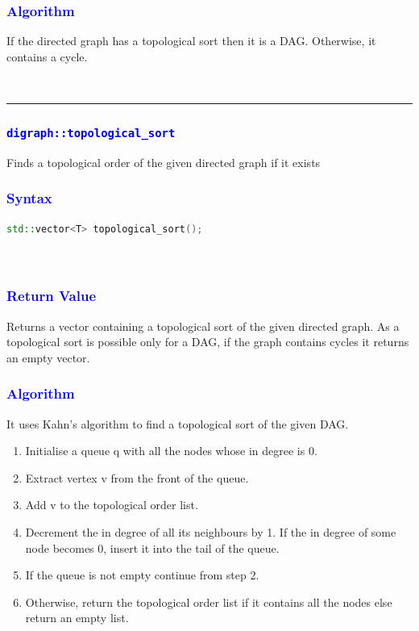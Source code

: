 \documentclass[11pt,a4paper]{article}
\begin{document}
\subsubsection*{\textcolor{blue}{ \large {Algorithm
}}}
If the directed graph has a topological sort then it is a DAG. Otherwise, it contains a cycle.


\\
\rule{17cm}{0.1mm}

\subsubsection*{\textcolor{blue}{\Large\texttt{digraph::topological\_sort
}}}
Finds a topological order of the given directed graph if it exists


\subsubsection*{\textcolor{blue}{ \large {Syntax}}}
\begin{lstlisting}[language=C++]
std::vector<T> topological_sort();




\end{lstlisting}
\subsubsection*{\textcolor{blue}{ \large {Return Value}}}
Returns a vector containing a topological sort of the given directed graph. As a topological sort is possible only for a DAG, if the graph contains cycles it returns an empty vector.





\subsubsection*{\textcolor{blue}{ \large {Algorithm}}}
It uses Kahn’s algorithm to find a topological sort of the given DAG.
\begin{enumerate}  
\item Initialise a queue q with all the nodes whose in degree is 0.
\item Extract vertex v from the front of the queue.
\item Add v to the topological order list.
\item Decrement the in degree of all its neighbours by 1. If the in degree of some node becomes 0, insert it into the tail of the queue.

\item If the queue is not empty continue from step 2.
\item Otherwise, return the topological order list if it contains all the nodes else return an empty list.

\end{enumerate} 
\end{document}
